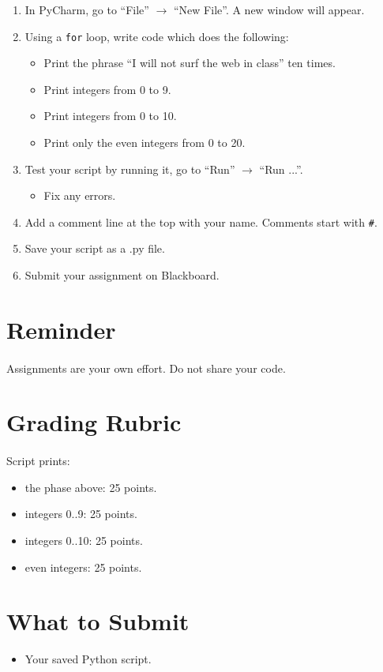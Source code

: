 \documentclass[letter,10pt]{article}
\begin{document}
    \begin{enumerate}
        \item In PyCharm, go to ``File'' $\rightarrow$ ``New File''. A new window will appear.
        \item Using a \texttt{for} loop, write code which does the following:
        \begin{itemize}
            \item Print the phrase ``I will not surf the web in class'' ten times.
            \item Print integers from 0 to 9.
            \item Print integers from 0 to 10.
            \item Print only the even integers from 0 to 20.
        \end{itemize}
        \item Test your script by running it, go to ``Run'' $\rightarrow$ ``Run ...''.
        \begin{itemize}
            \item Fix any errors.
        \end{itemize}
        \item Add a comment line at the top with your name. Comments start with \texttt{\#}.
        \item Save your script as a .py file.
        \item Submit your assignment on Blackboard.
    \end{enumerate}

    \section*{Reminder}
    \paragraph{}Assignments are your own effort. Do not share your code.

    \section*{Grading Rubric}
    \paragraph{}Script prints:
    \begin{itemize}
        \item the phase above: 25 points.
        \item integers 0..9: 25 points.
        \item integers 0..10: 25 points.
        \item even integers: 25 points.
    \end{itemize}
    
    \section*{What to Submit}
    \begin{itemize}
        \item Your saved Python script.
    \end{itemize}
    
\end{document}
